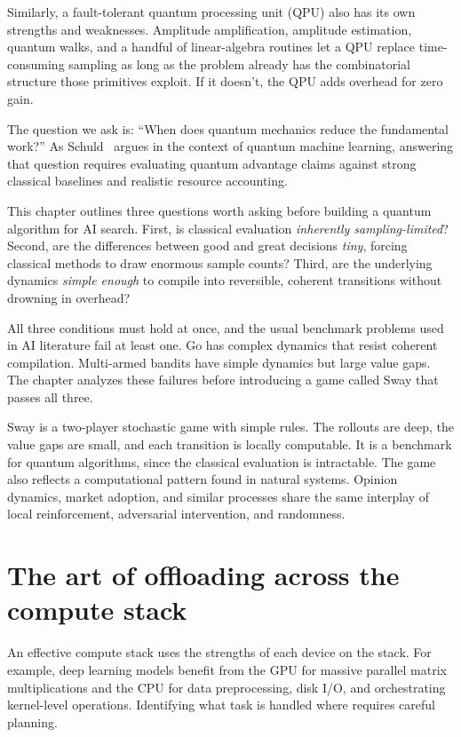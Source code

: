 Similarly, a fault-tolerant quantum processing unit (QPU) also has its own strengths and weaknesses.
Amplitude amplification, amplitude estimation, quantum walks, and a handful of linear-algebra routines let a QPU replace time-consuming sampling as long as the problem already has the combinatorial structure those primitives exploit.
If it doesn't, the QPU adds overhead for zero gain.

The question we ask is: ``When does quantum mechanics reduce the fundamental work?''
As Schuld~\cite{schuld2022} argues in the context of quantum machine learning, answering that question requires evaluating quantum advantage claims against strong classical baselines and realistic resource accounting.

This chapter outlines three questions worth asking before building a quantum algorithm for AI search. First, is classical evaluation \emph{inherently sampling-limited}? Second, are the differences between good and great decisions \emph{tiny}, forcing classical methods to draw enormous sample counts? Third, are the underlying dynamics \emph{simple enough} to compile into reversible, coherent transitions without drowning in overhead?

All three conditions must hold at once, and the usual benchmark problems used in AI literature fail at least one.
Go has complex dynamics that resist coherent compilation.
Multi-armed bandits have simple dynamics but large value gaps.
The chapter analyzes these failures before introducing a game called Sway that passes all three.

Sway is a two-player stochastic game with simple rules.
The rollouts are deep, the value gaps are small, and each transition is locally computable.
It is a benchmark for quantum algorithms, since the classical evaluation is intractable.
The game also reflects a computational pattern found in natural systems.
Opinion dynamics, market adoption, and similar processes share the same interplay of local reinforcement, adversarial intervention, and randomness.


\section{The art of offloading across the compute stack}

An effective compute stack uses the strengths of each device on the stack.
For example, deep learning models benefit from the GPU for massive parallel matrix multiplications and the CPU for data preprocessing, disk I/O, and orchestrating kernel-level operations.
Identifying what task is handled where requires careful planning.

